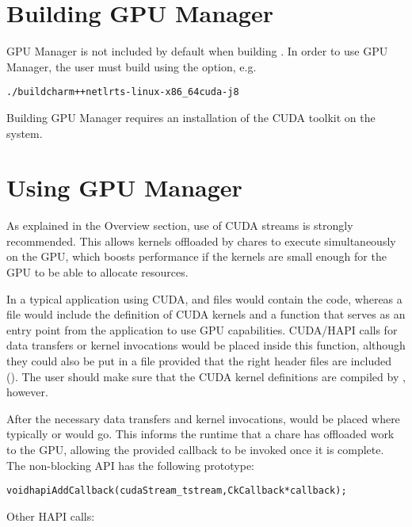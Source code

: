 \section{Building GPU Manager}

GPU Manager is not included by default when building \charmpp{}. In order to use
GPU Manager, the user must build \charmpp{} using the \cuda{} option, e.g.

\begin{alltt}
./build charm++ netlrts-linux-x86\_64 cuda -j8
\end{alltt}

Building GPU Manager requires an installation of the CUDA toolkit on the system.

\section{Using GPU Manager}

As explained in the Overview section, use of CUDA streams is strongly recommended.
This allows kernels offloaded by chares to execute simultaneously on the GPU,
which boosts performance if the kernels are small enough for the GPU to be able
to allocate resources.

In a typical \charmpp{} application using CUDA,  and  files
would contain the \charmpp{} code, whereas a  file would include the
definition of CUDA kernels and a function that serves as an entry point from
the \charmpp{} application to use GPU capabilities. CUDA/HAPI calls for data
transfers or kernel invocations would be placed inside this function, although
they could also be put in a  file provided that the right header files
are included (). The user should make sure
that the CUDA kernel definitions are compiled by , however.

After the necessary data transfers and kernel invocations, 
would be placed where typically  or
 would go. This informs the runtime that a chare has
offloaded work to the GPU, allowing the provided \charmpp{} callback to be
invoked once it is complete. The non-blocking API has the following prototype:

\begin{alltt}
  void hapiAddCallback(cudaStream\_t stream, CkCallback* callback);
\end{alltt}

Other HAPI calls:

